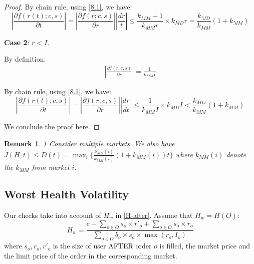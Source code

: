 \documentclass[notitlepage,reqno,11pt]{amsart}
\numberwithin{equation}{section}
\newtheorem{remark}{Remark}[section]
\begin{document}
\begin{proof}
    By chain rule, using \eqref{8.1}, we have:
    \begin{equation}
        \left|\frac{\partial f(r(t);c,s)}{\partial t} \right| = \left|\frac{\partial f(r;c,s)}{\partial r} \right| \left|\frac{dr}{t} \right| \leq \frac{k_{MM} + 1}{k_{MM}r} \times k_{MD} r = \frac{k_{MD}}{k_{MM}}(1+k_{MM})
    \end{equation}

    \textbf{Case 2}: $r < I$. 

    By definition:
    \begin{align}
        \left|\frac{\partial f(r;c,s)}{\partial r} \right| = \frac{1}{k_{MM}I} 
    \end{align}

    By chain rule, using \eqref{8.1}, we have:
    \begin{equation}
        \left|\frac{\partial f(r(t);c,s)}{\partial t} \right| = \left|\frac{\partial f(r;c,s)}{\partial r} \right| \left|\frac{dr}{dt} \right| \leq \frac{1}{k_{MM}I}  \times k_{MD} I < \frac{k_{MD}}{k_{MM}}(1 + k_{MM})
    \end{equation}

    We conclude the proof here.

    
\end{proof}

\begin{remark}\label{P-bound}1
    Consider multiple markets. We also have $J(H,t) \leq D(t) = \max_i \{\frac{k_{MD}(i)}{k_{MM}(i)}(1+k_{MM}(i))t\}$ where $k_{MM}(i)$ denote the $k_{MM}$ from market $i$.
\end{remark}

\subsection{Worst Health Volatility}\label{Hw-P-bound}
Our checks take into account of $H_w$ in \ref{H-after}. Assume that $H_w = H(O)$:
$$
H_w = \frac{c - \sum_{o\in O}s_o\times r'_o + \sum_{o\in O}s_o\times r_o}{\sum_{o\in O} b_o\times s_o\times\max(r_o, I_o)}
$$
where $s_o, r_o, r'_o$ is the size of user AFTER order $o$ is filled, the market price and the limit price of the order in the corresponding market.
\end{document}
